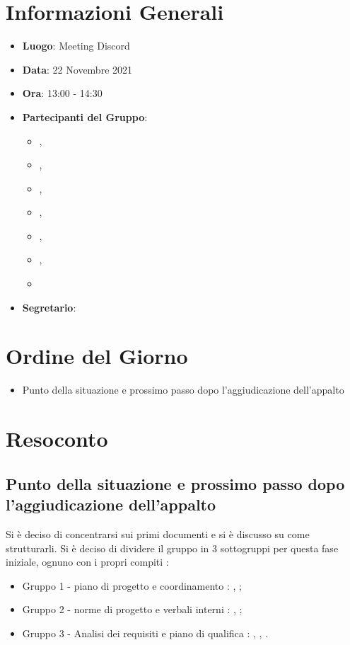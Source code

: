 \section{Informazioni Generali}

\begin{itemize}
\item{\textbf{Luogo}}: Meeting Discord
\item{\textbf{Data}}: 22 Novembre 2021
\item{\textbf{Ora}}: 13:00 - 14:30
\item{\textbf{Partecipanti del Gruppo}}: 
	\begin{itemize}
	\item{\EP{},} 
	\item{\FP{},}
	\item{\GC{},}
	\item{\LW{},}
	\item{\MB{},}
	\item{\MG{},}
	\item{\PV{}}
	\end{itemize} 
\item{\textbf{Segretario}}: \PV{}	
\end{itemize}

\section{Ordine del Giorno}
\begin{itemize}
\item{Punto della situazione e prossimo passo dopo l'aggiudicazione dell'appalto}
\end{itemize}

\section{Resoconto}

\subsection{Punto della situazione e prossimo passo dopo l'aggiudicazione dell'appalto}

Si è deciso di concentrarsi sui primi documenti e si è discusso su come strutturarli. Si è deciso di dividere il gruppo in 3 sottogruppi per questa fase iniziale, ognuno con i propri compiti : 

\begin{itemize}
\item{Gruppo 1 - piano di progetto e coordinamento : \EP{}, \MB{};}
\item{Gruppo 2 - norme di progetto e verbali interni : \PV{}, \MG{};}
\item{Gruppo 3 - Analisi dei requisiti e piano di qualifica : \FP{}, \GC{}, \LW{}.}
\end{itemize}

